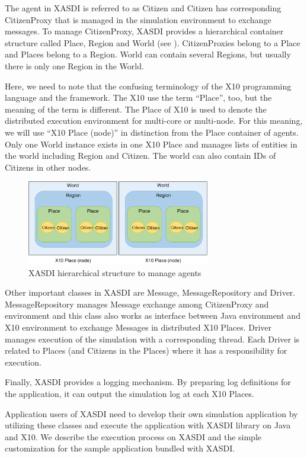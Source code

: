 The agent in XASDI is referred to as Citizen and Citizen has corresponding CitizenProxy that is managed in the simulation environment to exchange messages.
To manage CitizenProxy, XASDI provides a hierarchical container structure called Place, Region and World (see ). CitizenProxies belong to a Place and Places belong to a Region. World can contain several Regions, but usually there is only one Region in the World.


Here, we need to note that the confusing terminology of the X10 programming language and the framework.
The X10 use the term ``Place'', too, but the meaning of the term is different.
The Place of X10 is used to denote the distributed execution environment for multi-core or multi-node.
For this meaning, we will use ``X10 Place (node)'' in distinction from the Place container of agents.
Only one World instance exists in one X10 Place and manages lists of entities in the world including Region and Citizen.
The world can also contain IDs of Citizens in other nodes.

\begin{figure}[h]
  \centering
  \includegraphics[width=8cm]{Figs.mizuta/xasdiclass.pdf}
  \caption{XASDI hierarchical structure to manage agents}
  \label{fig:Figs.mizuta/xasdiclass}
\end{figure}

Other important classes in XASDI are Message, MessageRepository and Driver.
MessageRepository manages Message exchange among CitizenProxy and environment and this class also works as interface between Java environment and X10 environment to exchange Messages in distributed X10 Places.
Driver manages execution of the simulation with a corresponding thread. Each Driver is related to Places (and Citizens in the Places) where it has a responsibility for execution.

Finally, XASDI provides a logging mechanism. By preparing log definitions for the application, it can output the simulation log at each X10 Places. 


Application users of XASDI need to develop their own simulation application by utilizing these classes and execute the application with XASDI library on Java and X10.
We describe the execution process on XASDI and the simple customization for the sample application bundled with XASDI.

